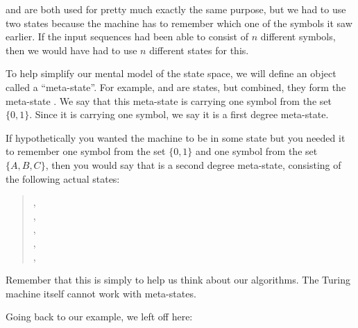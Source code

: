  and  are both used for pretty much exactly the same purpose, but we had to use two states because the machine has to remember which one of the symbols it saw earlier. If the input sequences had been able to consist of $n$ different symbols, then we would have had to use $n$ different states for this.

To help simplify our mental model of the state space, we will define an object called a ``meta-state''. For example,  and  are states, but combined, they form the meta-state . We say that this meta-state is carrying one symbol from the set $\{0, 1\}$. Since it is carrying one symbol, we say it is a first degree meta-state.

If hypothetically you wanted the machine to be in some state  but you needed it to remember one symbol from the set $\{0, 1\}$ and one symbol from the set $\{A,B,C\}$, then you would say that  is a second degree meta-state, consisting of the following actual states:
\begin{quote}
    , \\
    , \\
    , \\
    , \\
    , \\
\end{quote}
Remember that this is simply to help us think about our algorithms. The Turing machine itself cannot work with meta-states.

Going back to our example, we left off here:

